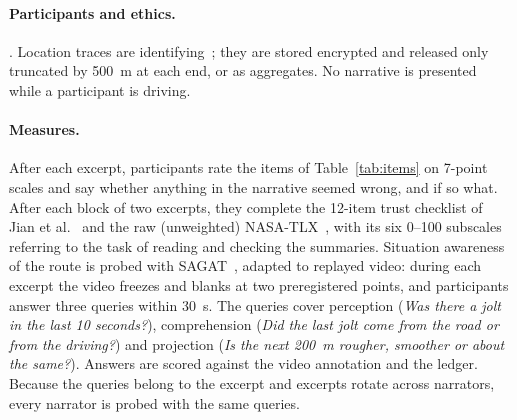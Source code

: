 \paragraph{Participants and ethics.}
.
Location traces are identifying~\cite{demontjoye2013unique}; they are stored encrypted and released only truncated by 500~m at each end, or as aggregates.
No narrative is presented while a participant is driving.

\paragraph{Measures.}
After each excerpt, participants rate the items of Table~\ref{tab:items} on 7-point scales and say whether anything in the narrative seemed wrong, and if so what.
After each block of two excerpts, they complete the 12-item trust checklist of Jian et al.~\cite{jian2000trust} and the raw (unweighted) NASA-TLX~\cite{hart1988tlx,hart2006tlx}, with its six 0--100 subscales referring to the task of reading and checking the summaries.
Situation awareness of the route is probed with SAGAT~\cite{endsley1995measurement}, adapted to replayed video: during each excerpt the video freezes and blanks at two preregistered points, and participants answer three queries within 30~s.
The queries cover perception (\emph{Was there a jolt in the last 10 seconds?}), comprehension (\emph{Did the last jolt come from the road or from the driving?}) and projection (\emph{Is the next 200~m rougher, smoother or about the same?}).
Answers are scored against the video annotation and the ledger.
Because the queries belong to the excerpt and excerpts rotate across narrators, every narrator is probed with the same queries.

